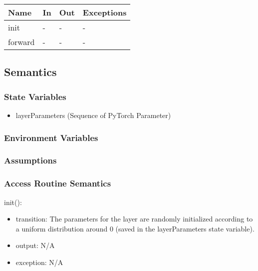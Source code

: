 \documentclass[12pt, titlepage]{article}
\begin{document}
\begin{center}
\begin{tabular}{p{2cm}|p{6cm}|p{4cm}|p{2cm}}
\hline
\textbf{Name} & \textbf{In} & \textbf{Out} & \textbf{Exceptions} \\
\hline
init & - & - & - \\
\hline
forward & - & - & - \\
\hline
\end{tabular}
\end{center}

\subsection{Semantics}

\subsubsection{State Variables}
\begin{itemize}
  \item layerParameters (Sequence of PyTorch Parameter)
\end{itemize}

\subsubsection{Environment Variables}



\subsubsection{Assumptions}



\subsubsection{Access Routine Semantics}
\noindent init():
\begin{itemize}
\item transition: The parameters for the layer are randomly initialized according to a uniform distribution around 0 (saved in the layerParameters state variable). 
\item output: N/A
\item exception: N/A
\end{itemize}
\end{document}
